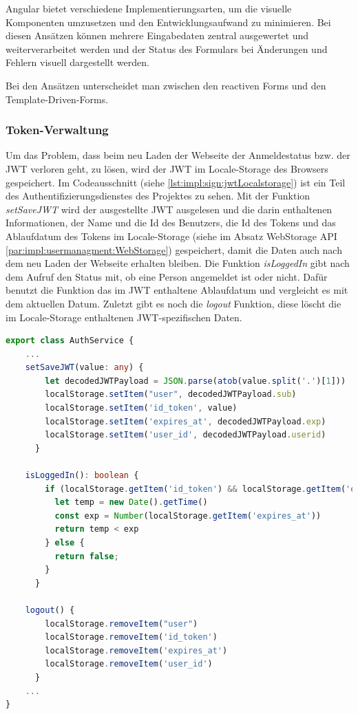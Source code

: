 Angular bietet verschiedene Implementierungsarten, um die visuelle Komponenten umzusetzen und den Entwicklungsaufwand zu minimieren. Bei diesen Ansätzen können mehrere Eingabedaten zentral ausgewertet und weiterverarbeitet werden und der Status des Formulars bei Änderungen und Fehlern visuell dargestellt werden. \cite[Bookmonkey - 12 Formularverarbeitung und
Validierung: Iteration IV]{AngularBuch}

Bei den Ansätzen unterscheidet man zwischen den reactiven Forms und den Template-Driven-Forms.

\subsubsection{Token-Verwaltung}
Um das Problem, dass beim neu Laden der Webseite der Anmeldestatus bzw. der JWT verloren geht, zu lösen, wird der JWT im Locale-Storage des Browsers gespeichert. 
Im Codeausschnitt (siehe \ref{lst:impl:sign:jwtLocalstorage}) ist ein Teil des Authentifizierungsdienstes des Projektes zu sehen. Mit der Funktion \emph{setSaveJWT} wird der ausgestellte JWT ausgelesen und die darin enthaltenen Informationen, der Name und die Id des Benutzers, die Id des Tokens und das Ablaufdatum des Tokens im Locale-Storage (siehe im Absatz WebStorage API \ref{par:impl:usermanagment:WebStorage}) gespeichert, damit die Daten auch nach dem neu Laden der Webseite erhalten bleiben. Die Funktion \emph{isLoggedIn} gibt nach dem Aufruf den Status mit, ob eine Person angemeldet ist oder nicht. Dafür benutzt die Funktion das im JWT enthaltene Ablaufdatum und vergleicht es mit dem aktuellen Datum. Zuletzt gibt es noch die \emph{logout} Funktion, diese löscht die im Locale-Storage enthaltenen JWT-spezifischen Daten.

\begin{lstlisting}[caption=auth.service.ts - JWT und Localstorage,label=lst:impl:sign:jwtLocalstorage,language=TypeScript ]
export class AuthService {
    ...
    setSaveJWT(value: any) {
        let decodedJWTPayload = JSON.parse(atob(value.split('.')[1]))
        localStorage.setItem("user", decodedJWTPayload.sub)
        localStorage.setItem('id_token', value)
        localStorage.setItem('expires_at', decodedJWTPayload.exp)
        localStorage.setItem('user_id', decodedJWTPayload.userid)
      }

    isLoggedIn(): boolean {
        if (localStorage.getItem('id_token') && localStorage.getItem('expires_at')) {
          let temp = new Date().getTime()
          const exp = Number(localStorage.getItem('expires_at'))
          return temp < exp
        } else {
          return false;
        }
      }

    logout() {
        localStorage.removeItem("user")
        localStorage.removeItem('id_token')
        localStorage.removeItem('expires_at')
        localStorage.removeItem('user_id')
      }
    ...
}        
\end{lstlisting}


